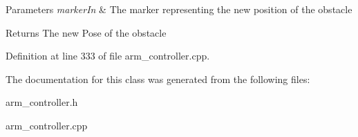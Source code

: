 \begin{DoxyParams}{Parameters}
{\em marker\+In} & The marker representing the new position of the obstacle \\
\hline
\end{DoxyParams}
\begin{DoxyReturn}{Returns}
The new Pose of the obstacle 
\end{DoxyReturn}


Definition at line 333 of file arm\+\_\+controller.\+cpp.



The documentation for this class was generated from the following files\+:\begin{DoxyCompactItemize}
\item 
arm\+\_\+controller.\+h\item 
arm\+\_\+controller.\+cpp\end{DoxyCompactItemize}
